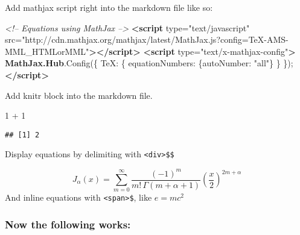 \documentclass[]{article}
\newenvironment{Shaded}{}{}
\newcommand{\KeywordTok}[1]{\textcolor[rgb]{0.00,0.44,0.13}{\textbf{{#1}}}}
\newcommand{\DataTypeTok}[1]{\textcolor[rgb]{0.56,0.13,0.00}{{#1}}}
\newcommand{\DecValTok}[1]{\textcolor[rgb]{0.25,0.63,0.44}{{#1}}}
\newcommand{\StringTok}[1]{\textcolor[rgb]{0.25,0.44,0.63}{{#1}}}
\newcommand{\CommentTok}[1]{\textcolor[rgb]{0.38,0.63,0.69}{\textit{{#1}}}}
\newcommand{\OtherTok}[1]{\textcolor[rgb]{0.00,0.44,0.13}{{#1}}}
\newcommand{\FunctionTok}[1]{\textcolor[rgb]{0.02,0.16,0.49}{{#1}}}
\newcommand{\NormalTok}[1]{{#1}}
\begin{document}
Add mathjax script right into the markdown file like so:

\begin{Shaded}
\begin{Highlighting}[]
\CommentTok{<!-- Equations using MathJax -->}
\KeywordTok{<script}\OtherTok{ type=}\StringTok{"text/javascript"}\OtherTok{ src=}\StringTok{"http://cdn.mathjax.org/mathjax/latest/MathJax.js?config=TeX-AMS-MML_HTMLorMML"}\KeywordTok{></script>}
\KeywordTok{<script}\OtherTok{ type=}\StringTok{"text/x-mathjax-config"}\KeywordTok{>} \KeywordTok{MathJax.Hub}\NormalTok{.}\FunctionTok{Config}\NormalTok{(\{ }\DataTypeTok{TeX}\NormalTok{: \{ }\DataTypeTok{equationNumbers}\NormalTok{: \{}\DataTypeTok{autoNumber}\NormalTok{: }\StringTok{"all"}\NormalTok{\} \} \});       }\KeywordTok{</script>}
\end{Highlighting}
\end{Shaded}
Add knitr block into the markdown file.

\begin{Shaded}
\begin{Highlighting}[]
\DecValTok{1} \NormalTok{+ }\DecValTok{1}
\end{Highlighting}
\end{Shaded}
\begin{verbatim}
## [1] 2
\end{verbatim}
Display equations by delimiting with
\texttt{\textless{}div\textgreater{}\$\$}

\[  J_\alpha(x) = \sum\limits_{m=0}^\infty \frac{(-1)^m}{m! \, \Gamma(m + \alpha + 1)}{\left({\frac{x}{2}}\right)}^{2 m + \alpha} \]
And inline equations with \texttt{\textless{}span\textgreater{}\$}, like
$e = mc^2$

\subsubsection{Now the following works:}
\end{document}
